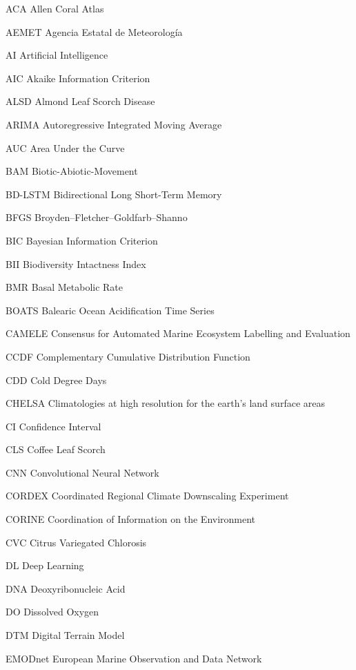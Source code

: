 \begin{abbreviations}

    \item[ACA] Allen Coral Atlas
    \item[AEMET] Agencia Estatal de Meteorología
    \item[AI] Artificial Intelligence
    \item[AIC] Akaike Information Criterion
    \item[ALSD] Almond Leaf Scorch Disease
    \item[ARIMA] Autoregressive Integrated Moving Average
    \item[AUC] Area Under the Curve
    \item[BAM] Biotic-Abiotic-Movement
    \item[BD-LSTM] Bidirectional Long Short-Term Memory
    \item[BFGS] Broyden–Fletcher–Goldfarb–Shanno
    \item[BIC] Bayesian Information Criterion
    \item[BII] Biodiversity Intactness Index
    \item[BMR] Basal Metabolic Rate
    \item[BOATS] Balearic Ocean Acidification Time Series
    \item[CAMELE] Consensus for Automated Marine Ecosystem Labelling and
    Evaluation
    \item[CCDF] Complementary Cumulative Distribution Function
    \item[CDD] Cold Degree Days
    \item[CHELSA] Climatologies at high resolution for the earth’s land surface
    areas
    \item[CI] Confidence Interval
    \item[CLS] Coffee Leaf Scorch
    \item[CNN] Convolutional Neural Network
    \item[CORDEX] Coordinated Regional Climate Downscaling Experiment
    \item[CORINE] Coordination of Information on the Environment
    \item[CVC] Citrus Variegated Chlorosis
    \item[DL] Deep Learning
    \item[DNA] Deoxyribonucleic Acid
    \item[DO] Dissolved Oxygen
    \item[DTM] Digital Terrain Model
    \item[EMODnet] European Marine Observation and Data Network

\end{abbreviations}
